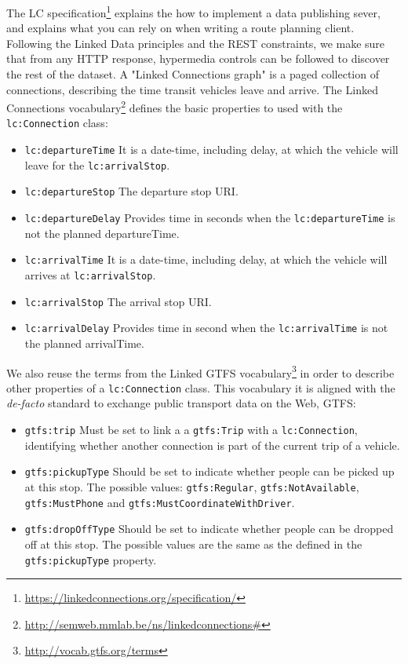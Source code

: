 \documentclass[sw]{iosart2x}
\begin{document}
The LC specification\footnote{\url{https://linkedconnections.org/specification/}} explains the how to implement a data publishing sever, and explains what you can rely on when writing a route planning client. Following the Linked Data principles and the REST constraints, we make sure that from any HTTP response, hypermedia controls can be followed to discover the rest of the dataset. A "Linked Connections graph" is a paged collection of connections, describing the time transit vehicles leave and arrive. The Linked Connections vocabulary\footnote{\url{http://semweb.mmlab.be/ns/linkedconnections\#}} defines the basic properties to used with the \texttt{lc:Connection} class:
\begin{itemize}
	\item \texttt{lc:departureTime} It is a date-time, including delay, at which the vehicle will leave for the \texttt{lc:arrivalStop}.
	\item \texttt{lc:departureStop} The departure stop URI.
	\item \texttt{lc:departureDelay} Provides time in seconds when the \texttt{lc:departureTime} is not the planned departureTime.
	\item \texttt{lc:arrivalTime} It is a date-time, including delay, at which the vehicle will arrives at \texttt{lc:arrivalStop}.
	\item \texttt{lc:arrivalStop} The arrival stop URI.
	\item \texttt{lc:arrivalDelay} Provides time in second when the \texttt{lc:arrivalTime} is not the planned arrivalTime.
\end{itemize}

We also reuse the terms from the Linked GTFS vocabulary\footnote{\url{http://vocab.gtfs.org/terms}} in order to describe other properties of a \texttt{lc:Connection} class. This vocabulary it is aligned with the \textit{de-facto} standard to exchange public transport data on the Web, GTFS:

\begin{itemize}
\item \texttt{gtfs:trip} Must be set to link a a \texttt{gtfs:Trip} with a \texttt{lc:Connection}, identifying whether another connection is part of the current trip of a vehicle.
\item \texttt{gtfs:pickupType} Should be set to indicate whether people can be picked up at this stop. The possible values: \texttt{gtfs:Regular}, \texttt{gtfs:NotAvailable}, \texttt{gtfs:MustPhone} and \texttt{gtfs:MustCoordinateWithDriver}.
\item \texttt{gtfs:dropOffType} Should be set to indicate whether people can be dropped off at this stop. The possible values are the same as the defined in the \texttt{gtfs:pickupType} property.
\end{itemize}
\end{document}
